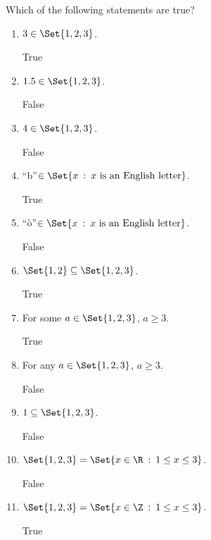 \documentclass{problemset}
\providecommand\given{}
\newcommand\SetSymbol[1][]{%
	\nonscript\::%
	\allowbreak
	\nonscript\:
	\mathopen{}}
\renewcommand\given{\SetSymbol[\delimsize]}
\begin{document}
	\begin{parts}
		\item Which of the following statements are true?
		\begin{enumerate}
			\item $3\in\Set{1,2,3}$.
				\begin{solution}[inline]True\end{solution}
			\item $1.5\in\Set{1,2,3}$.
				\begin{solution}[inline]False\end{solution}
			\item $4\in\Set{1,2,3}$.
				\begin{solution}[inline]False\end{solution}
			\item ``b''$\in \Set{ x \given x\text{ is an English letter}}$.
				\begin{solution}[inline]True\end{solution}
			\item ``\`o''$\in \Set{x \given x\text{ is an English letter}}$.
				\begin{solution}[inline]False\end{solution}
			\item $\Set{1,2} \subseteq \Set{1,2,3}$.
				\begin{solution}[inline]True\end{solution}
			\item For some $a\in \Set{1,2,3}$, $a \geq 3$.
				\begin{solution}[inline]True\end{solution}
			\item For any $a\in \Set{1,2,3}$, $a\geq 3$.
				\begin{solution}[inline]False\end{solution}
			\item $1 \subseteq \Set{1,2,3}$.
				\begin{solution}[inline]False\end{solution}
			\item $\Set{1,2,3}=\Set{x\in\R \given 1\leq x\leq 3}$.
				\begin{solution}[inline]False\end{solution}
			\item $\Set{1,2,3}=\Set{x\in\Z \given 1\leq x\leq 3}$.
				\begin{solution}[inline]True\end{solution}
		\end{enumerate}
	\end{parts}
\end{document}
